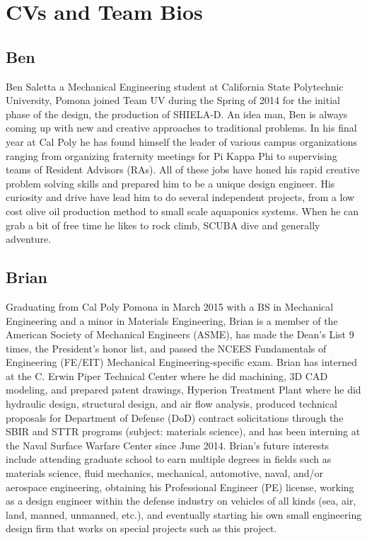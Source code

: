 \documentclass{report}
\begin{document}
\section{CVs and Team Bios}
\subsection{Ben}
Ben Saletta a Mechanical Engineering student at California State Polytechnic University, Pomona joined Team UV during the Spring of 2014 for the initial phase of the design, the production of SHIELA-D. An idea man, Ben is always coming up with new and creative approaches to  traditional problems.  In his final year at Cal Poly he has found himself the leader of various campus organizations ranging from organizing fraternity meetings for Pi Kappa Phi to supervising teams of Resident Advisors (RAs).  All of these jobs have honed his rapid creative problem solving skills and prepared him to be a unique design engineer.  His curiosity and drive have lead him to do several independent projects, from a low cost olive oil production method to small scale aquaponics systems.  When he can grab a bit of free time he likes to rock climb, SCUBA dive and generally adventure.
\subsection{Brian}
Graduating from Cal Poly Pomona in March 2015 with a BS in Mechanical Engineering and a minor in Materials Engineering, Brian is a member of the American Society of Mechanical Engineers (ASME), has made the Dean’s List 9 times, the President’s honor list, and passed the NCEES Fundamentals of Engineering (FE/EIT) Mechanical Engineering-specific exam.  Brian has interned at the C. Erwin Piper Technical Center where he did machining, 3D CAD modeling, and prepared patent drawings, Hyperion Treatment Plant where he did hydraulic design, structural design, and air flow analysis, produced technical proposals for Department of Defense (DoD) contract solicitations through the SBIR and STTR programs (subject: materials science), and has been interning at the Naval Surface Warfare Center since June 2014.  Brian’s future interests include attending graduate school to earn multiple degrees in fields such as materials science, fluid mechanics, mechanical, automotive, naval, and/or aerospace engineering, obtaining his Professional Engineer (PE) license, working as a design engineer within the defense industry on vehicles of all kinds (sea, air, land, manned, unmanned, etc.), and eventually starting his own small engineering design firm that works on special projects such as this project.
\end{document}
